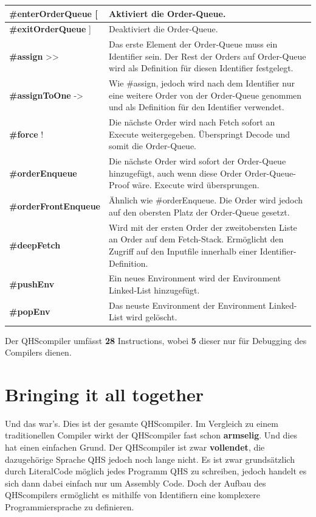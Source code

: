 \begin{table}[H]
    \centering
    \begin{tabularx}{\textwidth}{l|X}
    \textbf{\#enterOrderQueue} [    & Aktiviert die Order-Queue. \\ \hline
    \textbf{\#exitOrderQueue} ]     & Deaktiviert die Order-Queue. \\ \hline
    \textbf{\#assign} >>            & Das erste Element der Order-Queue muss ein Identifier sein. Der Rest der Orders auf Order-Queue wird als Definition für diesen Identifier festgelegt. \\ \hline
    \textbf{\#assignToOne} ->       & Wie \#assign, jedoch wird nach dem Identifier nur eine weitere Order von der Order-Queue genommen und als Definition für den Identifier verwendet. \\ \hline
    \textbf{\#force} !              & Die nächste Order wird nach Fetch sofort an Execute weitergegeben. Überspringt Decode und somit die Order-Queue. \\ \hline
    \textbf{\#orderEnqueue}         & Die nächste Order wird sofort der Order-Queue hinzugefügt, auch wenn diese Order Order-Queue-Proof wäre. Execute wird übersprungen. \\ \hline
    \textbf{\#orderFrontEnqueue}    & Ähnlich wie \#orderEnqueue. Die Order wird jedoch auf den obersten Platz der Order-Queue gesetzt. \\ \hline
    \textbf{\#deepFetch}            & Wird mit der ersten Order der zweitobersten Liste an Order auf dem Fetch-Stack. Ermöglicht den Zugriff auf den Inputfile innerhalb einer Identifier-Definition. \\ \hline
    \textbf{\#pushEnv}              & Ein neues Environment wird der Environment Linked-List hinzugefügt. \\ \hline
    \textbf{\#popEnv}               & Das neuste Environment der Environment Linked-List wird gelöscht.
        
    \end{tabularx}
\end{table}

Der QHScompiler umfässt \textbf{28} Instructions, wobei \textbf{5} dieser nur für Debugging des Compilers dienen.

\section{Bringing it all together}
Und das war's. Dies ist der gesamte QHScompiler. Im Vergleich zu einem traditionellen Compiler wirkt der QHScompiler fast schon \textbf{armselig}. Und dies hat einen einfachen Grund. Der QHScompiler ist zwar \textbf{vollendet},
die dazugehörige Sprache QHS jedoch noch lange nicht. Es ist zwar grundsätzlich durch LiteralCode möglich jedes Programm QHS zu schreiben, jedoch handelt es sich dann dabei einfach nur um Assembly Code.
Doch der Aufbau des QHScompilers ermöglicht es mithilfe von Identifiern eine komplexere Programmiersprache zu definieren.

